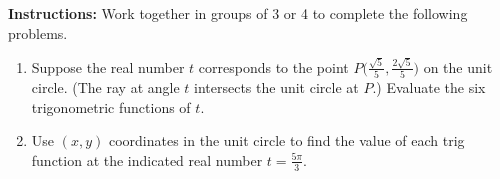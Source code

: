



\noindent \textbf{Instructions:}  Work together in groups of  3 or 4 to complete the following problems.\\


\begin{enumerate}

\item Suppose the real number $t$ corresponds to the point $P\Big(\frac{\sqrt{5}}{5}, \frac{2\sqrt{5}}{5}\Big)$ on the unit circle.  (The ray at angle $t$ intersects the unit circle at $P$.)  Evaluate the six trigonometric functions of $t$.
\begin{enumerate}
\end{enumerate}

\vfill

\item Use $(x,y)$ coordinates in the unit circle to find the value of each trig function at the indicated real number $t=\frac{5\pi}{3}$.
\begin{enumerate}
\end{enumerate}


\end{enumerate}
